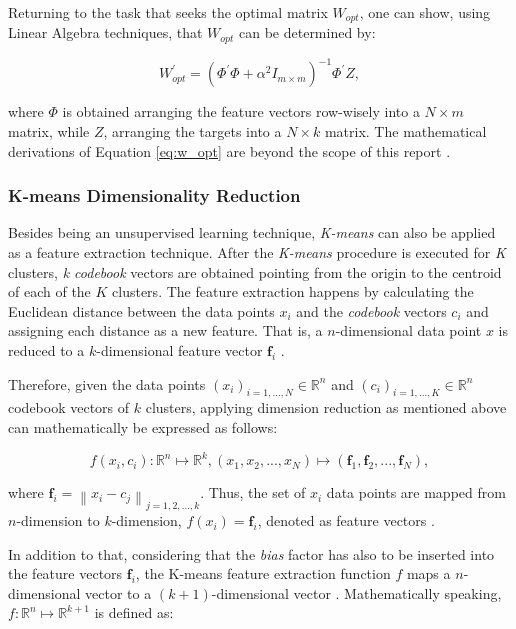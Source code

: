 \documentclass{article}
\newcommand{\norm}[1]{\left\lVert#1\right\rVert}
\begin{document}
Returning to the task that seeks the optimal matrix $W_{opt}$, one can show, using Linear Algebra techniques, that $W_{opt}$ can be determined by:

\begin{equation}
    W^{\prime}_{opt} = (\Phi^{\prime}\Phi + \alpha^2 I_{m \times m})^{-1} \Phi^{\prime}Z, \label{eq:w_opt}
\end{equation}

\noindent
where $\Phi$ is obtained arranging the feature vectors row-wisely into a $N \times m$ matrix, while $Z$, arranging the targets into a $N \times k$ matrix. The mathematical derivations of Equation \eqref{eq:w_opt} are beyond the scope of this report \parencite[See][equation 19-26]{lecturenotes}.

\subsubsection{K-means Dimensionality Reduction} \label{sec:k-means}

Besides being an unsupervised learning technique, \textit{K-means} can also be applied as a feature extraction technique. After the \textit{K-means} procedure is executed for \textit{K} clusters, \textit{k codebook} vectors are obtained pointing from the origin to the centroid of each of the $K$ clusters. The feature extraction happens by calculating the Euclidean distance between the data points $x_i$ and the \textit{codebook} vectors $c_i$ and assigning each distance as a new feature. That is, a $n$-dimensional data point $x$ is reduced to a $k$-dimensional feature vector $\mathbf{f}_i$ \parencite {lecturenotes}.

Therefore, given the data points $(x_i)_{i=1,...,N} \in \mathbb{R}^{n}$ and $(c_i)_{i=1,...,K} \in \mathbb{R}^{n}$ codebook vectors of $k$ clusters, applying dimension reduction as mentioned above can mathematically be expressed as follows:

\begin{equation}
	f(x_i, c_i): \mathbb{R}^n \mapsto \mathbb{R}^k, (x_1, x_2,...,x_N) \mapsto (\mathbf{f}_1, \mathbf{f}_2,...,\mathbf{f}_N),
\end{equation}

\noindent
where $\mathbf{f}_i = \norm{x_i - c_j}_{j = 1, 2,..., k}$. Thus, the set of $x_i$ data points are mapped from $n$-dimension to $k$-dimension, $f(x_i) = \mathbf{f}_i$, denoted as feature vectors \parencite {lecturenotes}.

In addition to that, considering that the \textit{bias} factor has also to be inserted into the feature vectors $\mathbf{f}_i$, the K-means feature extraction function $f$ maps a $n$-dimensional vector to a $(k+1)$-dimensional vector \parencite {lecturenotes}. Mathematically speaking, $f: \mathbb{R}^n \mapsto \mathbb{R}^{k+1}$ is defined as:
\end{document}
